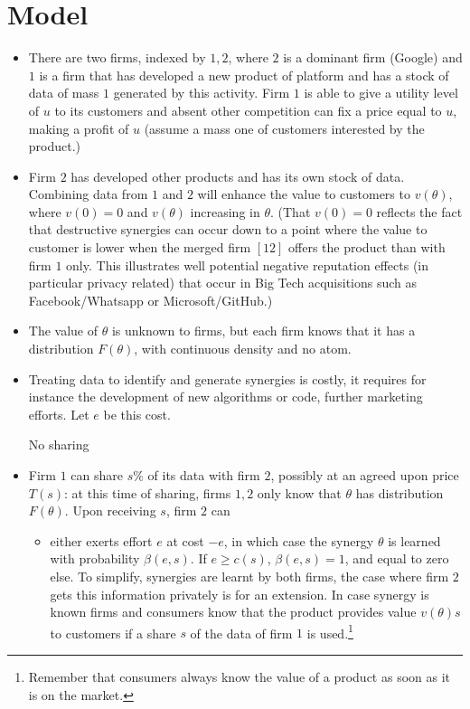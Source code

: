 \documentclass[a4paper,leqno]{article}%
\renewcommand{\t}{\theta}
\renewcommand{\t}{\theta}
\begin{document}
\section{Model}
\begin{itemize}
    \item There are two firms, indexed by $1,2$, where $2$ is a dominant firm (Google) and $1$ is a firm that has developed a new product of platform and has a stock of data of mass $1$ generated by this activity. Firm $1$ is able to give a utility level of $u$ to its customers and absent other competition can fix a price equal to $u$, making a profit of $u$ (assume a mass one of customers interested by the product.)
    \item Firm $2$ has developed other products and has its own stock of data. Combining data from $1$ and $2$ will enhance the value to customers to $v(\t)$, where $v(0)=0$ and $v(\t)$ increasing in $\t$. (That $v(0)=0$ reflects the fact that destructive synergies can occur down to a point where the value to customer is lower when the merged firm $[12]$ offers the product than with firm $1$ only. This illustrates well potential negative reputation effects (in particular privacy related) that occur in Big Tech acquisitions such as Facebook/Whatsapp or Microsoft/GitHub.)
    \item The value of $\t$ is unknown to firms, but each firm knows that it has a distribution $F(\t)$, with continuous density and no atom.
    \item Treating data to identify and generate synergies is costly, it requires for instance the development of new algorithms or code, further marketing efforts. Let $e$ be this cost. 
    \item [No sharing]
    \item Firm $1$ can share $s\%$ of its data with firm $2$, possibly at an agreed upon price $T(s)$: at this time of sharing, firms $1,2$ only know that $\t$ has distribution $F(\t)$. Upon receiving $s$, firm $2$ can 
    \begin{itemize}
        \item either exerts effort $e$ at cost $-e$, in which case the synergy $\t$ is learned with probability $\beta(e,s)$. If $e\geq c(s)$, $\beta(e,s)=1$, and equal to zero else. To simplify, synergies are learnt by both firms, the case where firm $2$ gets this information privately is for an extension. In case synergy is known firms and consumers know that the product provides value $v(\t)s$ to customers if a share $s$ of the data of firm $1$ is used.\footnote{Remember that consumers always know the value of a product as soon as it is on the market.} 

\end{itemize}
\end{itemize}
\end{document}
